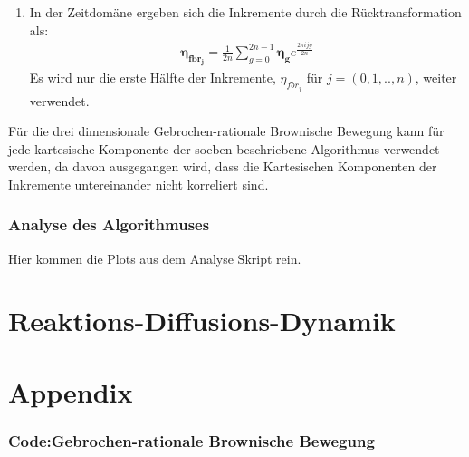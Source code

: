 \documentclass[
  a4paper,BCOR10mm,oneside,
  bibtotoc,idxtotoc,
  headsepline,footsepline,%
  fleqn,openbib
]{scrbook}
\begin{document}
\begin{enumerate}
 \item In der Zeitdomäne ergeben sich die Inkremente durch die Rücktransformation als:
 \begin{align}
 \boldsymbol{\eta_{fbr_j}}= \frac{1}{2n} \sum_{g=0}^{2n-1} \boldsymbol{\eta_g} e^{\frac{2 \pi i j g }{2n}}
 \end{align}
Es wird nur die erste Hälfte der Inkremente, $\eta_{fbr_j}$ für $j=(0,1,..,n)$, weiter verwendet.
\end{enumerate}
Für die drei dimensionale Gebrochen-rationale Brownische Bewegung kann für jede kartesische Komponente der soeben beschriebene Algorithmus verwendet werden, da davon ausgegangen wird, dass die Kartesischen Komponenten der Inkremente untereinander nicht korreliert sind. 
\subsection{Analyse des Algorithmuses}
Hier kommen die Plots  aus dem Analyse Skript rein.
\chapter{Reaktions-Diffusions-Dynamik}
\chapter{Appendix}
\subsection{Code:Gebrochen-rationale Brownische Bewegung}


\nocite{}



\end{document}
